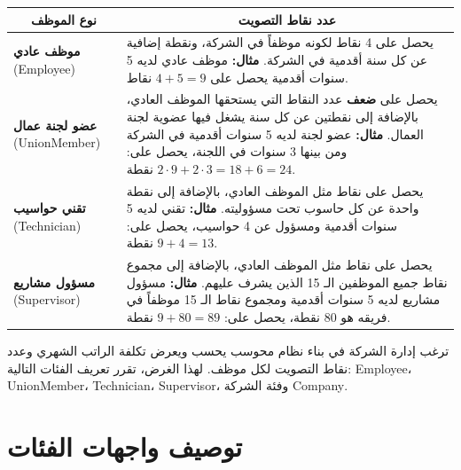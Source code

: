 \documentclass[14pt]{extarticle}
\begin{document}
\begin{center}
\renewcommand{\arraystretch}{1.6}
{\small
\begin{tabular}{|p{}|p{}|}
\hline
\multicolumn{1}{|c|}{\textbf{نوع الموظف}} & \multicolumn{1}{c|}{\textbf{عدد نقاط التصويت}} \\
\hline
\textbf{موظف عادي} \newline (\textenglish{Employee}) &
يحصل على 4 نقاط لكونه موظفاً في الشركة، ونقطة إضافية عن كل سنة أقدمية في الشركة. \newline
\textbf{مثال:} موظف عادي لديه 5 سنوات أقدمية يحصل على $4 + 5 = 9$ نقاط. \\
\hline
\textbf{عضو لجنة عمال} \newline (\textenglish{UnionMember}) &
يحصل على \textbf{ضعف} عدد النقاط التي يستحقها الموظف العادي، بالإضافة إلى نقطتين عن كل سنة يشغل فيها عضوية لجنة العمال. \newline
\textbf{مثال:} عضو لجنة لديه 5 سنوات أقدمية في الشركة ومن بينها 3 سنوات في اللجنة، يحصل على: $2 \cdot 9 + 2 \cdot 3 = 18 + 6 = 24$ نقطة. \\
\hline
\textbf{تقني حواسيب} \newline (\textenglish{Technician}) &
يحصل على نقاط مثل الموظف العادي، بالإضافة إلى نقطة واحدة عن كل حاسوب تحت مسؤوليته. \newline
\textbf{مثال:} تقني لديه 5 سنوات أقدمية ومسؤول عن 4 حواسيب، يحصل على: $9 + 4 = 13$ نقطة. \\
\hline
\textbf{مسؤول مشاريع} \newline (\textenglish{Supervisor}) &
يحصل على نقاط مثل الموظف العادي، بالإضافة إلى مجموع نقاط جميع الموظفين الـ 15 الذين يشرف عليهم. \newline
\textbf{مثال:} مسؤول مشاريع لديه 5 سنوات أقدمية ومجموع نقاط الـ 15 موظفاً في فريقه هو 80 نقطة، يحصل على: $9 + 80 = 89$ نقطة. \\
\hline
\end{tabular}
}
\end{center}

ترغب إدارة الشركة في بناء نظام محوسب يحسب ويعرض تكلفة الراتب الشهري وعدد نقاط التصويت لكل موظف. لهذا الغرض، تقرر تعريف الفئات التالية:
\textenglish{Employee}، \textenglish{UnionMember}، \textenglish{Technician}، \textenglish{Supervisor}، وفئة الشركة \textenglish{Company}.

\clearpage

\section*{توصيف واجهات الفئات}
\end{document}
